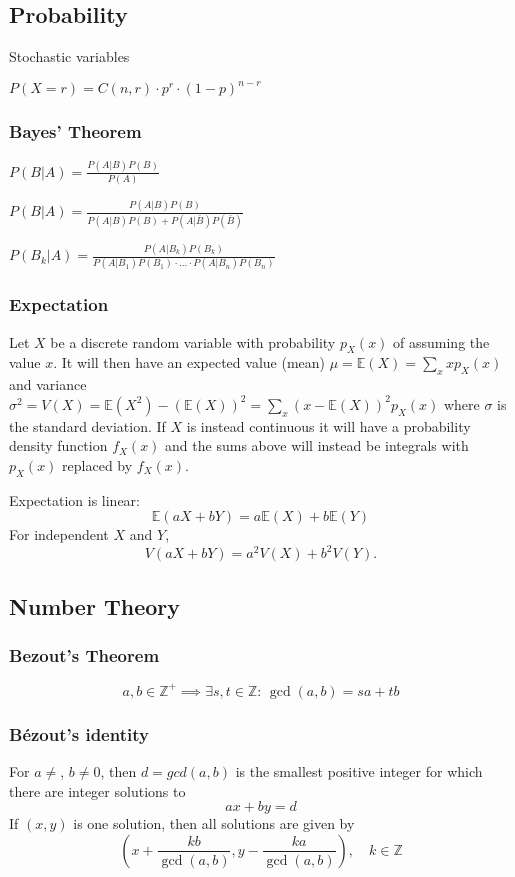 \documentclass[
	a4paper,
	landscape,
	10pt,
]{article}
\begin{document}
\begin{multicols}{3}
    \subsection{Probability} Stochastic variables

        $P(X=r) = C(n,r) \cdot p^r \cdot (1-p)^{n-r}$

        \subsubsection*{Bayes' Theorem}

        $P(B|A) = \frac{P(A|B) P(B)}{P(A)}$
        
        $P(B|A) = \frac{P(A|B)P(B)}{P(A|B)P(B) + P(A|\bar{B})P(\bar{B})}$
        
        $P(B_k|A) = \frac{P(A|B_k)P(B_k)}{P(A|B_1)P(B_1) \cdot ... \cdot P(A|B_n)P(B_n)}$

        \subsubsection*{Expectation}

        Let $X$ be a discrete random variable with probability $p_X(x)$ of assuming the value $x$. It will then have an expected value (mean) $\mu=\mathbb{E}(X)=\sum_xxp_X(x)$ and variance $\sigma^2=V(X)=\mathbb{E}(X^2)-(\mathbb{E}(X))^2=\sum_x(x-\mathbb{E}(X))^2p_X(x)$ where $\sigma$ is the standard deviation. If $X$ is instead continuous it will have a probability density function $f_X(x)$ and the sums above will instead be integrals with $p_X(x)$ replaced by $f_X(x)$.

	Expectation is linear:
	\[\mathbb{E}(aX+bY) = a\mathbb{E}(X)+b\mathbb{E}(Y)\]
	For independent $X$ and $Y$, \[V(aX+bY) = a^2V(X)+b^2V(Y).\]

    \subsection{Number Theory}
        \subsubsection*{Bezout's Theorem}
        $$
        a,b \in \mathbb{Z^+} \implies \exists s,t \in \mathbb{Z}: \, \gcd(a,b) = sa + tb
        $$
        \subsubsection*{Bézout's identity}
	For $a \neq $, $b \neq 0$, then $d=gcd(a,b)$ is the smallest positive integer for which there are integer solutions to
	$$ax+by=d$$
	If $(x,y)$ is one solution, then all solutions are given by
	$$\left(x+\frac{kb}{\gcd(a,b)}, y-\frac{ka}{\gcd(a,b)}\right), \quad k\in\mathbb{Z}$$


\end{multicols}
\end{document}
